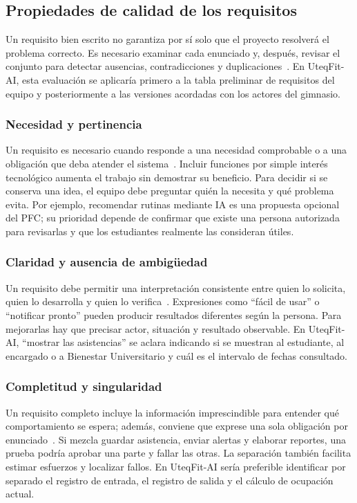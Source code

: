 \subsection{Propiedades de calidad de los requisitos}
\label{sec:calidad-requisitos}

Un requisito bien escrito no garantiza por sí solo que el proyecto resolverá el problema correcto. Es necesario examinar cada enunciado y, después, revisar el conjunto para detectar ausencias, contradicciones y duplicaciones~\cite{ieee29148}. En UteqFit-AI, esta evaluación se aplicaría primero a la tabla preliminar de requisitos del equipo y posteriormente a las versiones acordadas con los actores del gimnasio.

\subsubsection{Necesidad y pertinencia}
Un requisito es necesario cuando responde a una necesidad comprobable o a una obligación que deba atender el sistema~\cite{ieee29148}. Incluir funciones por simple interés tecnológico aumenta el trabajo sin demostrar su beneficio. Para decidir si se conserva una idea, el equipo debe preguntar quién la necesita y qué problema evita. Por ejemplo, recomendar rutinas mediante IA es una propuesta opcional del PFC; su prioridad depende de confirmar que existe una persona autorizada para revisarlas y que los estudiantes realmente las consideran útiles.

\subsubsection{Claridad y ausencia de ambigüedad}
Un requisito debe permitir una interpretación consistente entre quien lo solicita, quien lo desarrolla y quien lo verifica~\cite{ieee29148}. Expresiones como ``fácil de usar'' o ``notificar pronto'' pueden producir resultados diferentes según la persona. Para mejorarlas hay que precisar actor, situación y resultado observable. En UteqFit-AI, ``mostrar las asistencias'' se aclara indicando si se muestran al estudiante, al encargado o a Bienestar Universitario y cuál es el intervalo de fechas consultado.

\subsubsection{Completitud y singularidad}
Un requisito completo incluye la información imprescindible para entender qué comportamiento se espera; además, conviene que exprese una sola obligación por enunciado~\cite{ieee29148}. Si mezcla guardar asistencia, enviar alertas y elaborar reportes, una prueba podría aprobar una parte y fallar las otras. La separación también facilita estimar esfuerzos y localizar fallos. En UteqFit-AI sería preferible identificar por separado el registro de entrada, el registro de salida y el cálculo de ocupación actual.

